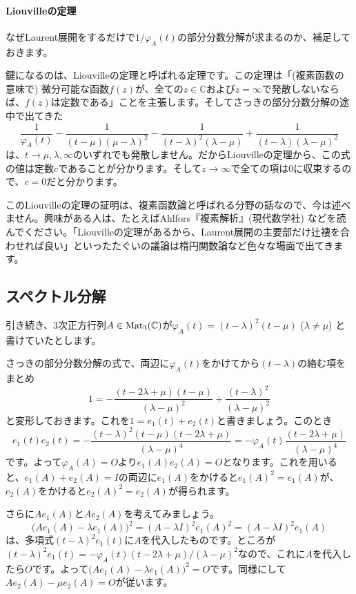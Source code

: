 \paragraph{Liouvilleの定理}

なぜLaurent展開をするだけで$1/\varphi_A(t)$の部分分数分解が求まるのか、補足しておきます。

鍵になるのは、Liouvilleの定理と呼ばれる定理です。この定理は「(複素函数の意味で) 微分可能な函数$f(z)$が、全ての$z \in \mathbb{C}$および$z = \infty$で発散しないならば、$f(z)$は定数である」ことを主張します。そしてさっきの部分分数分解の途中で出てきた
\[
\frac{1}{\varphi_A(t)}
- \frac{1}{(t - \mu)(\mu - \lambda)^2} - \frac{1}{(t - \lambda)^2(\lambda - \mu)} + \frac{1}{(t - \lambda)(\lambda - \mu)^2}
\]
は、$t \rightarrow \mu, \lambda, \infty$のいずれでも発散しません。だからLiouvilleの定理から、この式の値は定数$c$であることが分かります。そして$z \rightarrow \infty$で全ての項は$0$に収束するので、$c = 0$だと分かります。

このLiouvilleの定理の証明は、複素函数論と呼ばれる分野の話なので、今は述べません。興味がある人は、たとえばAhlfors『複素解析』(現代数学社) などを読んでください。「Liouvilleの定理があるから、Laurent展開の主要部だけ辻褄を合わせれば良い」といったたぐいの議論は楕円関数論など色々な場面で出てきます。

\subsection{スペクトル分解}

引き続き、$3$次正方行列$A \in \operatorname{Mat}_3(\mathbb{C})$が$\varphi_A(t) = (t - \lambda)^2 (t - \mu)$ ($\lambda \neq \mu$) と書けていたとします。

さっきの部分分数分解の式で、両辺に$\varphi_A(t)$をかけてから$(t - \lambda)$の絡む項をまとめ
\[
1 = - \frac{(t - 2\lambda + \mu)(t - \mu)}{(\lambda - \mu)^2} + \frac{(t - \lambda)^2}{(\lambda - \mu)^2}
\]
と変形しておきます。これを$1 = e_1(t) + e_2(t)$と書きましょう。このとき
\[
e_1(t) e_2(t) = -\frac{(t - \lambda)^2 (t - \mu) (t - 2\lambda + \mu)}{(\lambda - \mu)^4} = -\varphi_A(t)\frac{(t - 2\lambda + \mu)}{(\lambda - \mu)^4}
\]
です。よって$\varphi_A(A) = O$より$e_1(A)e_2(A) = O$となります。これを用いると、$e_1(A) + e_2(A) = I$の両辺に$e_1(A)$をかけると$e_1(A)^2 = e_1(A)$が、$e_2(A)$をかけると$e_2(A)^2 = e_2(A)$が得られます。

さらに$A e_1(A)$と$A e_2(A)$を考えてみましょう。
\[
\bigl(A e_1(A) - \lambda e_1(A)\bigr)^2 = (A - \lambda I)^2 e_1(A)^2 = (A - \lambda I)^2 e_1(A)
\]
は、多項式$(t - \lambda)^2 e_1(t)$に$A$を代入したものです。ところが$(t - \lambda)^2 e_1(t) = - \varphi_A(t) (t - 2\lambda + \mu)/(\lambda - \mu)^2$なので、これに$A$を代入したら$O$です。よって$\bigl(A e_1(A) - \lambda e_1(A)\bigr)^2 = O$です。同様にして$A e_2(A) - \mu e_2(A) = O$が従います。

